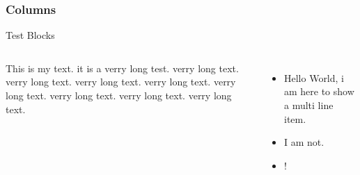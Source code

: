 \subsubsection{Columns}

\begin{frame}{Test Blocks}
	\begin{columns}
		 This is my text. it is a verry long test. verry long
		text. verry long text. verry long text. verry long text. verry long text. verry long text. verry long text. verry long text.
		 \begin{itemize}
			\item Hello World, i am here to show a multi line item.
			\item I am not.
			\item !
		\end{itemize}
	\end{columns}
\end{frame}


